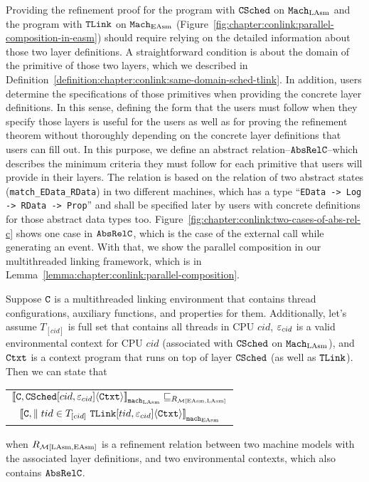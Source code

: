 Providing the refinement proof for the program with ${{\mathrm{\texttt{CSched}}}}$ on ${\mathrm{\texttt{Mach}}}_{\mathrm{LAsm}}$ and the program with ${{\mathrm{\texttt{TLink}}}}$ on ${\mathrm{\texttt{Mach}}}_{\mathrm{EAsm}}$ (Figure~\ref{fig:chapter:conlink:parallel-composition-in-easm})
should require relying on the detailed information about those two layer definitions.
A straightforward condition is about the domain of the primitive of those two layers, which we described in Definition~\ref{definition:chapter:conlink:same-domain-sched-tlink}. 
In addition,
users determine the specifications of those primitives when providing the concrete layer definitions. 
In this sense, defining the form that the users must follow when they specify those layers
is useful for the users as well as for proving the refinement theorem without thoroughly depending on the concrete layer definitions that users can fill out.  
In this purpose, we define an abstract relation--${{\mathrm{\texttt{AbsRelC}}}}$--which describes the minimum criteria they must follow for each primitive that users will provide in their layers.
The relation is based on the relation of two abstract states (\lstinline$match_EData_RData$) in two different machines, which has a
type ``\lstinline$EData -> Log -> RData -> Prop$'' and shall be specified later by users with  concrete definitions for those abstract data types too. Figure~\ref{fig:chapter:conlink:two-cases-of-abs-rel-c} shows 
one case in  ${{\mathrm{\texttt{AbsRelC}}}}$, which is the case 
of  the external call while generating an event. 
With that, we show the parallel composition in our multithreaded linking framework, which is in Lemma~\ref{lemma:chapter:conlink:parallel-composition}. 

\begin{lemma}
\label{lemma:chapter:conlink:parallel-composition}
Suppose  ${{\mathrm{\texttt{C}}}}$ is a multithreaded linking environment that contains thread configurations, auxiliary functions, and properties for them. 
Additionally, let's assume   $T_{[cid]}$ is full set that contains all threads in CPU $cid$, 
 ${\varepsilon}_{cid}$ is a valid
environmental context for CPU $cid$ (associated with ${{\mathrm{\texttt{CSched}}}}$ on ${\mathrm{\texttt{Mach}}}_{\mathrm{LAsm}}$),
and ${\mathrm{\texttt{Ctxt}}}$ is a
context program that runs on top of layer ${{\mathrm{\texttt{CSched}}}}$ (as well as ${{\mathrm{\texttt{TLink}}}}$).
 Then we can state that
 \begin{center}
\begin{tabular}{c}
${[\![{{{\mathrm{\texttt{C}}}}, {{\mathrm{\texttt{CSched}}}}[cid, {\varepsilon}_{cid}]} \langle {{\mathrm{\texttt{Ctxt}}}} \rangle]\!]}_{{\mathrm{\texttt{mach}}}_{\mathrm{LAsm}}} \sqsubseteq_{R_{\mathcal{M}{[\mathrm{EAsm}, \mathrm{LAsm}]}}}$\\ 
${[\![{{{\mathrm{\texttt{C}}}}, \parallel tid \in T_{[cid]} \  {{\mathrm{\texttt{TLink}}}}[tid, {\varepsilon}_{cid}]} \langle {{\mathrm{\texttt{Ctxt}}}} \rangle]\!]}_{{{\mathrm{\texttt{mach}}}_{\mathrm{EAsm}}}}$\\
\end{tabular}
\end{center}
when $R_{\mathcal{M}{[\mathrm{LAsm}, \mathrm{EAsm}]}}$ is a refinement relation between two machine models with the associated layer definitions, and
 two environmental contexts,
which also contains ${{\mathrm{\texttt{AbsRelC}}}}$.
\end{lemma}


